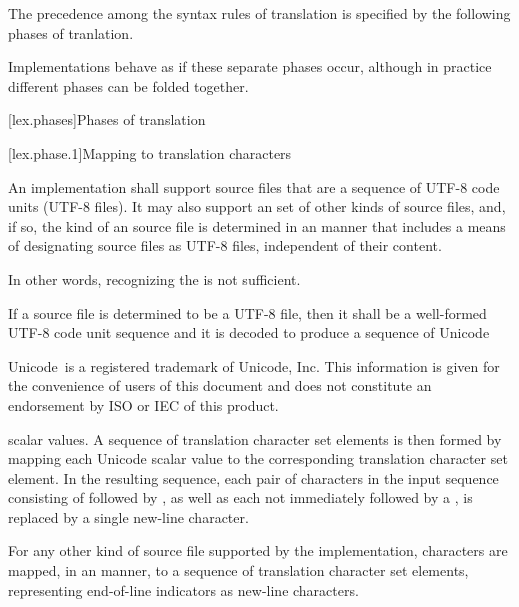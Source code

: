 \pnum
{}%
The precedence among the syntax rules of translation is specified by the
following phases of tranlation.

\pnum
\begin{note}
Implementations behave as if these separate phases
occur, although in practice different phases can be folded together.
\end{note}

[lex.phases]{Phases of translation}%

[lex.phase.1]{Mapping to translation characters}%

\pnum
{}%
An implementation shall support source files
that are a sequence of UTF-8 code units (UTF-8 files).
It may also support
an  set of other kinds of source files, and,
if so, the kind of an source file is determined in
an  manner
that includes a means of designating source files as UTF-8 files,
independent of their content.

\pnum
\begin{note}
In other words,
recognizing the  is not sufficient.
\end{note}

\pnum
If a source file is determined to be a UTF-8 file,
then it shall be a well-formed UTF-8 code unit sequence and
it is decoded to produce a sequence of Unicode
\begin{footnote}
Unicode\textregistered\ is a registered trademark of Unicode, Inc.
This information is given for the convenience of users of this document and
does not constitute an endorsement by ISO or IEC of this product.
\end{footnote}
scalar values.
A sequence of translation character set elements is then formed
by mapping each Unicode scalar value
to the corresponding translation character set element.
In the resulting sequence,
each pair of characters in the input sequence consisting of
 followed by ,
as well as each
 not immediately followed by a ,
is replaced by a single new-line character.

\pnum
For any other kind of source file supported by the implementation,
characters are mapped, in an
 manner,
to a sequence of translation character set elements,
representing end-of-line indicators as new-line characters.

